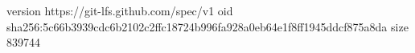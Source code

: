 version https://git-lfs.github.com/spec/v1
oid sha256:5c66b3939cdc6b2102c2ffc18724b996fa928a0eb64e1f8ff1945ddcf875a8da
size 839744
